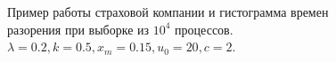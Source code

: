 \documentclass[12pt, a4paper]{article}
\begin{document}
\begin{figure}[H]
\caption{Пример работы страховой компании и гистограмма времен разорения при выборке из $10^4$ процессов. $\lambda = 0.2, k=0.5, x_m=0.15, u_0 = 20, c=2.$}
\end{figure}
\end{document}
